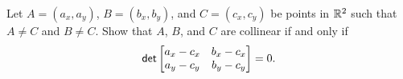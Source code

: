 \begin{exercise}
Let $A = (a_x,a_y)$, $B = (b_x,b_y)$, and $C = (c_x,c_y)$ be points in $\mathbb{R}^2$ such that $A \neq C$ and $B \neq C$. Show that $A$, $B$, and $C$ are collinear if and only if \[ \mathsf{det} \begin{bmatrix} a_x - c_x & b_x - c_x \\ a_y - c_y & b_y - c_y \end{bmatrix} = 0. \]
\end{exercise}
